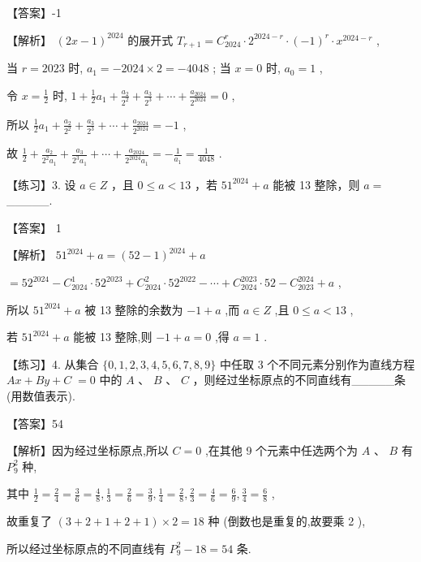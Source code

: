 \documentclass[10pt]{article}
\begin{document}
【答案】-1

【解析】 \({\left( 2x - 1\right) }^{2024}\) 的展开式 \({T}_{r + 1} = {C}_{2024}^{r} \cdot  {2}^{{2024} - r} \cdot  {\left( -1\right) }^{r} \cdot  {x}^{{2024} - r}\) ,

当 \(r = {2023}\) 时, \({a}_{1} =  - {2024} \times  2 =  - {4048}\) ; 当 \(x = 0\) 时, \({a}_{0} = 1\) ,

令 \(x = \frac{1}{2}\) 时, \(1 + \frac{1}{2}{a}_{1} + \frac{{a}_{2}}{{2}^{2}} + \frac{{a}_{3}}{{2}^{3}} + \cdots  + \frac{{a}_{2024}}{{2}^{2024}} = 0\) ,

所以 \(\frac{1}{2}{a}_{1} + \frac{{a}_{2}}{{2}^{2}} + \frac{{a}_{3}}{{2}^{3}} + \cdots  + \frac{{a}_{2024}}{{2}^{2024}} =  - 1\) ,

故 \(\frac{1}{2} + \frac{{a}_{2}}{{2}^{2}{a}_{1}} + \frac{{a}_{3}}{{2}^{3}{a}_{1}} + \cdots  + \frac{{a}_{2024}}{{2}^{2024}{a}_{1}} =  - \frac{1}{{a}_{1}} = \frac{1}{4048}\) .

【练习】3. 设 \(a \in  Z\) ，且 \(0 \leq  a < {13}\) ，若 \({51}^{2024} + a\) 能被 13 整除，则 \(a =\) \_\_\_\_\_.

【答案】 1

【解析】 \({51}^{2024} + a = {\left( {52} - 1\right) }^{2024} + a\)

\(= {52}^{2024} - {C}_{2024}^{1} \cdot  {52}^{2023} + {C}_{2024}^{2} \cdot  {52}^{2022} - \cdots  + {C}_{2024}^{2023} \cdot  {52} - {C}_{2023}^{2024} + a\) ,

所以 \({51}^{2024} + a\) 被 13 整除的余数为 \(- 1 + a\) ,而 \(a \in  Z\) ,且 \(0 \leq  a < {13}\) ,

若 \({51}^{2024} + a\) 能被 13 整除,则 \(- 1 + a = 0\) ,得 \(a = 1\) .

【练习】4. 从集合 \(\{ 0,1,2,3,4,5,6,7,8,9\}\) 中任取 3 个不同元素分别作为直线方程 \({Ax} + {By} + C \; = 0\) 中的 \(A\text{ 、 }B\text{ 、 }C\) ，则经过坐标原点的不同直线有\_\_\_\_\_条(用数值表示).

【答案】54

【解析】因为经过坐标原点,所以 \(C = 0\) ,在其他 9 个元素中任选两个为 \(A\text{ 、 }B\) 有 \({P}_{9}^{2}\) 种,

其中 \(\frac{1}{2} = \frac{2}{4} = \frac{3}{6} = \frac{4}{8},\frac{1}{3} = \frac{2}{6} = \frac{3}{9},\frac{1}{4} = \frac{2}{8},\frac{2}{3} = \frac{4}{6} = \frac{6}{9},\frac{3}{4} = \frac{6}{8}\) ,

故重复了 \(\left( {3 + 2 + 1 + 2 + 1}\right)  \times  2 = {18}\) 种 (倒数也是重复的,故要乘 2 ),

所以经过坐标原点的不同直线有 \({P}_{9}^{2} - {18} = {54}\) 条.
\end{document}
